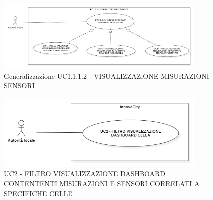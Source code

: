 





\begin{figure}[H]
    \centering
    \includegraphics[width=0.9\textwidth]{../Images/uc1.1.1.2Gen.PNG}
    \caption{Generalizzazione UC1.1.1.2 - VISUALIZZAZIONE MISURAZIONI SENSORI }
    \label{fig:UC3_gen}
\end{figure}

\newpage









\begin{figure}[H]
    \centering
    \includegraphics[width=0.9\textwidth]{../Images/uc2.png}
    \caption{UC2 - FILTRO VISUALIZZAZIONE DASHBOARD CONTENTENTI MISURAZIONI E SENSORI CORRELATI A SPECIFICHE CELLE}
    \label{fig:UC2}
\end{figure}

